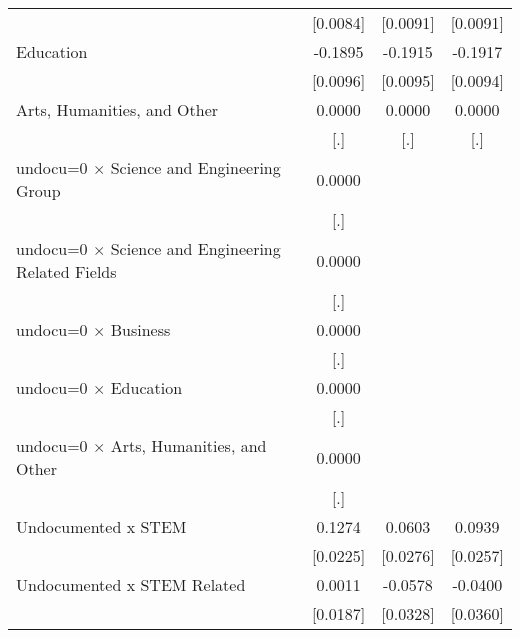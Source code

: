 \begin{table}[htbp]
\begin{tabular}{l*{3}{c}}
                    &    [0.0084]         &    [0.0091]         &    [0.0091]         \\
\addlinespace
Education           &     -0.1895\sym{***}&     -0.1915\sym{***}&     -0.1917\sym{***}\\
                    &    [0.0096]         &    [0.0095]         &    [0.0094]         \\
\addlinespace
Arts, Humanities, and Other&      0.0000         &      0.0000         &      0.0000         \\
                    &         [.]         &         [.]         &         [.]         \\
\addlinespace
undocu=0 $\times$ Science and Engineering Group&      0.0000         &                     &                     \\
                    &         [.]         &                     &                     \\
\addlinespace
undocu=0 $\times$ Science and Engineering Related Fields&      0.0000         &                     &                     \\
                    &         [.]         &                     &                     \\
\addlinespace
undocu=0 $\times$ Business&      0.0000         &                     &                     \\
                    &         [.]         &                     &                     \\
\addlinespace
undocu=0 $\times$ Education&      0.0000         &                     &                     \\
                    &         [.]         &                     &                     \\
\addlinespace
undocu=0 $\times$ Arts, Humanities, and Other&      0.0000         &                     &                     \\
                    &         [.]         &                     &                     \\
\addlinespace
Undocumented x STEM &      0.1274\sym{***}&      0.0603\sym{**} &      0.0939\sym{***}\\
                    &    [0.0225]         &    [0.0276]         &    [0.0257]         \\
\addlinespace
Undocumented x STEM Related&      0.0011         &     -0.0578\sym{*}  &     -0.0400         \\
                    &    [0.0187]         &    [0.0328]         &    [0.0360]         \\

\end{tabular}
\end{table}
